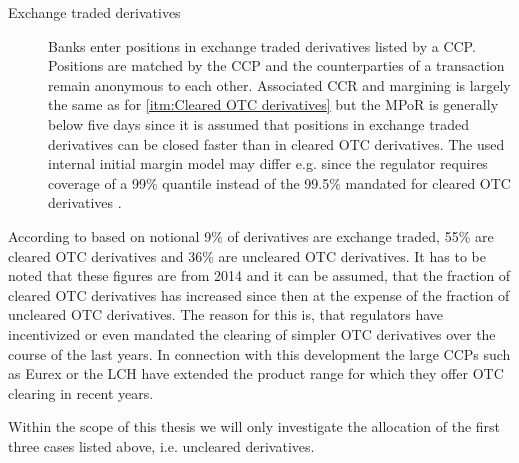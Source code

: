 \documentclass[../Thesis_AHoecherl.tex]{subfiles}
\begin{document}
\begin{description}
    \item[Exchange traded derivatives\label{itm:Exchange traded derivatives}] 
    Banks enter positions in exchange traded derivatives listed by a CCP. Positions are matched by the CCP and the counterparties of a transaction remain anonymous to each other. Associated \gls{CCR} and margining is largely the same as for \ref{itm:Cleared OTC derivatives} but the \gls{MPoR} is generally below five days since it is assumed that positions in exchange traded derivatives can be closed faster than in cleared \gls{OTC} derivatives. The used internal initial margin model may differ e.g. since the regulator requires coverage of a 99\% quantile instead of the 99.5\% mandated for cleared \gls{OTC} derivatives .
\end{description}

According to \cite[Figure~3.2]{gregory2015xva} based on notional 9\% of derivatives are exchange traded, 55\% are cleared OTC derivatives and 36\% are uncleared OTC derivatives. It has to be noted that these figures are from 2014 and it can be assumed, that the fraction of cleared OTC derivatives has increased since then at the expense of the fraction of uncleared OTC derivatives. The reason for this is, that regulators have incentivized or even mandated the clearing of simpler OTC derivatives over the course of the last years. In connection with this development the large CCPs such as Eurex or the LCH have extended the product range for which they offer OTC clearing in recent years.

Within the scope of this thesis we will only investigate the allocation of the first three cases listed above, i.e. uncleared derivatives.
\end{document}
